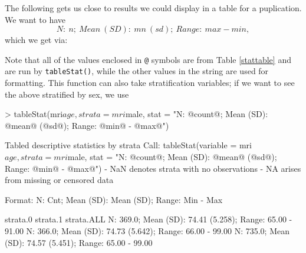 \documentclass[landscape]{article}
\renewenvironment{Schunk}{\vspace{\topsep}}{\vspace{\topsep}}
\begin{document}
\FloatBarrier
The following gets us close to results we could display in a table for a puplication. We want to have 
\begin{displaymath}
N: \ n; \ Mean \ (SD): \ mn \ (sd); \ Range: \ max - min,
\end{displaymath}
which we get via:
\begin{Schunk}
\end{Schunk}

Note that all of the values enclosed in \texttt{@} symbols are from Table \ref{stattable} and are run by \texttt{tableStat()}, while the other values in the string are used for formatting. This function can also take stratification variables; if we want to see the above stratified by sex, we use
\begin{Schunk}
\begin{Sinput}
> tableStat(mri$age, strata = mri$male, stat = "N: @count@; Mean (SD): @mean@ (@sd@); Range: @min@ - @max@")
\end{Sinput}
\begin{Soutput}
Tabled descriptive statistics by strata
Call:
      tableStat(variable = mri$age, strata = mri$male, stat = "N: @count@; Mean (SD): @mean@ (@sd@); Range: @min@ - @max@") 
            - NaN denotes strata with no observations
            - NA arises from missing or censored data

Format:  N: Cnt; Mean (SD): Mean (SD); Range: Min - Max 

                                                strata.0                                                 strata.1                                               strata.ALL 
N: 369.0; Mean (SD): 74.41 (5.258); Range: 65.00 - 91.00 N: 366.0; Mean (SD): 74.73 (5.642); Range: 66.00 - 99.00 N: 735.0; Mean (SD): 74.57 (5.451); Range: 65.00 - 99.00 
\end{Soutput}
\end{Schunk}
\end{document}
